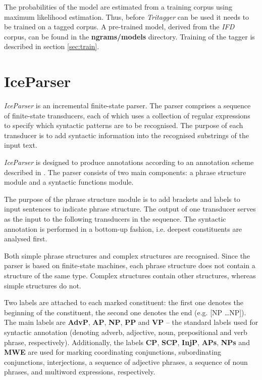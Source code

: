 \documentclass[11pt]{article}
\begin{document}
The probabilities of the model are estimated from a training corpus using maximum likelihood estimation.
Thus, before \emph{Tritagger} can be used it needs to be trained on a tagged corpus.
A pre-trained model, derived from the \emph{IFD} corpus, can be found in the {\bf ngrams/models} directory.
Training of the tagger is described in section \ref{sec:train}.

\section{IceParser}
\emph{IceParser} is an incremental finite-state parser.
The parser comprises a sequence of finite-state transducers, each of which uses a collection of regular expressions to specify which syntactic patterns are to be recognised.
The purpose of each transducer is to add syntactic information into the recognised substrings of the input text.

\emph{IceParser} is designed to produce annotations according to an annotation scheme described in \citep{lof06c}.
The parser consists of two main components: a phrase structure module and a syntactic functions module.

The purpose of the phrase structure module is to add brackets and labels to input sentences to indicate phrase structure.
The output of one transducer serves as the input to the following transducers in the sequence.
The syntactic annotation is performed in a bottom-up fashion, i.e. deepest constituents are analysed first.

Both simple phrase structures and complex structures are recognised.
Since the parser is based on finite-state machines, each phrase structure does not contain a structure of the same type.
Complex structures contain other structures, whereas simple structures do not.

Two labels are attached to each marked constituent: the first one denotes the beginning of the constituent, the second one denotes the end (e.g. [NP \ldots NP]).
The main labels are \textbf{AdvP}, \textbf{AP}, \textbf{NP}, \textbf{PP} and \textbf{VP} -- the standard labels used for syntactic annotation (denoting adverb, adjective, noun, prepositional and verb phrase, respectively).
Additionally, the labels \textbf{CP}, \textbf{SCP}, \textbf{InjP}, \textbf{APs}, \textbf{NPs} and \textbf{MWE} are used for marking coordinating conjunctions, subordinating conjunctions, interjections, a sequence of adjective phrases, a sequence of noun phrases, and multiword expressions, respectively.
\end{document}
